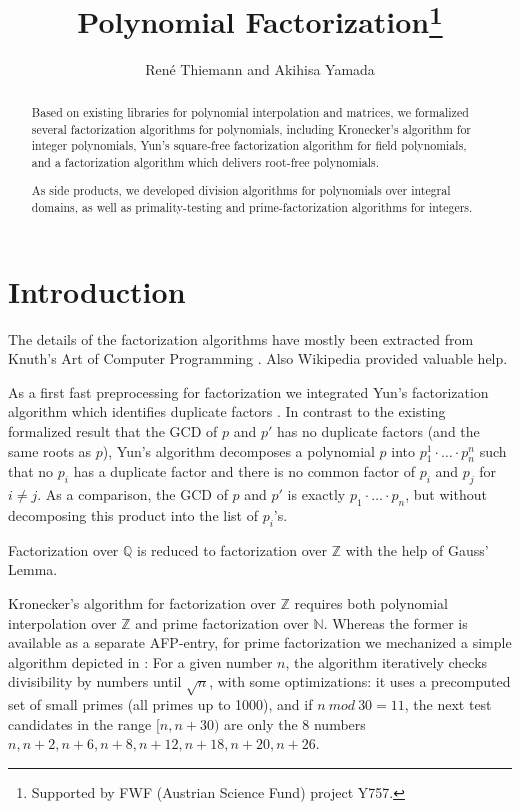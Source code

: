 \documentclass[11pt,a4paper]{article}
\newcommand\rats{\mathbb{Q}}
\newcommand\ints{\mathbb{Z}}
\newcommand\nats{\mathbb{N}}
\newcommand\mod{\mathit{mod}}
\begin{document}
\title{Polynomial Factorization\footnote{Supported by FWF (Austrian Science Fund) project Y757.}}
\author{Ren\'e Thiemann and Akihisa Yamada}
\maketitle

\begin{abstract}
Based on existing libraries for polynomial interpolation and matrices,
we formalized several factorization algorithms for polynomials, including
Kronecker's algorithm for integer polynomials,
Yun's square-free factorization algorithm for field polynomials, and
a factorization algorithm which delivers root-free polynomials. 

As side products, we developed division algorithms for polynomials over integral domains,
as well as primality-testing and prime-factorization algorithms for integers.
\end{abstract}

\tableofcontents

\section{Introduction}

The details of the factorization algorithms have mostly been extracted 
from Knuth's Art of Computer Programming
\cite{Knuth}. Also Wikipedia provided valuable help.

\medskip
As a first fast
preprocessing for factorization we integrated Yun's factorization algorithm which identifies duplicate
factors \cite{Yun}. In contrast to the existing formalized result that the GCD of $p$ and $p'$ has no
duplicate factors (and the same roots as $p$), Yun's algorithm decomposes a polynomial $p$ into
$p_1^1 \cdot \ldots \cdot p_n^n$ such that no $p_i$ has a duplicate factor and there is no common
factor of $p_i$ and $p_j$ for $i \neq j$. As a comparison, the GCD of $p$ and $p'$ is exactly
$p_1 \cdot \ldots \cdot p_n$, but without decomposing this product into the list of $p_i$'s.

Factorization over $\rats$ is reduced to factorization over $\ints$ 
with the help of Gauss' Lemma.

Kronecker's algorithm for factorization over $\ints$ requires both
polynomial interpolation over $\ints$ and prime factorization over $\nats$. Whereas the former
is available as a separate AFP-entry, for prime factorization we mechanized a simple algorithm depicted
in \cite{Knuth}:
For a given number $n$,
the algorithm iteratively checks divisibility by numbers until $\sqrt n$,
with some optimizations:
it uses a precomputed set of small primes (all primes up to 1000), 
and if $n\ \mod\ 30 = 11$, the next test candidates in the range $[n,n+30)$ 
are only the 8 numbers $n,n+2,n+6,n+8,n+12,n+18,n+20,n+26$.
\end{document}
